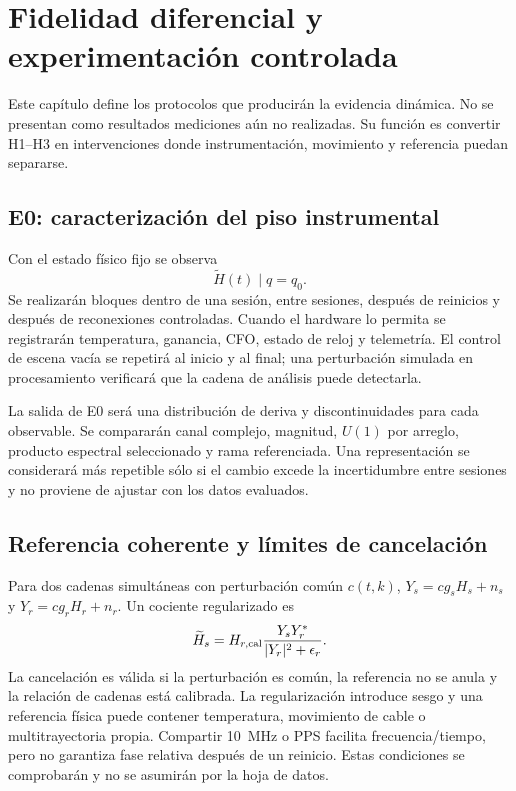 \chapter{Fidelidad diferencial y experimentación controlada}
\label{ch:differential_experiments}
\label{ch:experimental_design}

Este capítulo define los protocolos que producirán la evidencia dinámica. No se presentan como resultados mediciones aún no realizadas. Su función es convertir H1--H3 en intervenciones donde instrumentación, movimiento y referencia puedan separarse.

\section{E0: caracterización del piso instrumental}

Con el estado físico fijo se observa
\begin{equation}
\widetilde H(t)\mid q=q_0.
\end{equation}
Se realizarán bloques dentro de una sesión, entre sesiones, después de reinicios y después de reconexiones controladas. Cuando el hardware lo permita se registrarán temperatura, ganancia, CFO, estado de reloj y telemetría. El control de escena vacía se repetirá al inicio y al final; una perturbación simulada en procesamiento verificará que la cadena de análisis puede detectarla.

La salida de E0 será una distribución de deriva y discontinuidades para cada observable. Se compararán canal complejo, magnitud, $U(1)$ por arreglo, producto espectral seleccionado y rama referenciada. Una representación se considerará más repetible sólo si el cambio excede la incertidumbre entre sesiones y no proviene de ajustar con los datos evaluados.

\section{Referencia coherente y límites de cancelación}

Para dos cadenas simultáneas con perturbación común $c(t,k)$,
$Y_s=cg_sH_s+n_s$ y $Y_r=cg_rH_r+n_r$. Un cociente regularizado es
\begin{equation}
\widetilde H_s=H_{r,\rm cal}\frac{Y_sY_r^*}{|Y_r|^2+\epsilon_r}.
\label{eq:cabled_reference_ratio}
\end{equation}
La cancelación es válida si la perturbación es común, la referencia no se anula y la relación de cadenas está calibrada. La regularización introduce sesgo y una referencia física puede contener temperatura, movimiento de cable o multitrayectoria propia. Compartir \SI{10}{MHz} o PPS facilita frecuencia/tiempo, pero no garantiza fase relativa después de un reinicio. Estas condiciones se comprobarán y no se asumirán por la hoja de datos.

